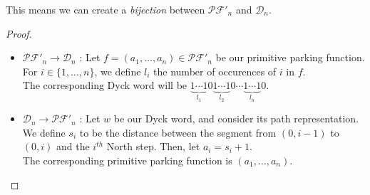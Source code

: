 \begin{example}[$n = 3$]
\begin{center}
    \end{center}
\end{example}

\begin{prop}
    This means we can create a \emph{bijection} between
    $\mathcal{PF'}_n$ and $\mathcal{D}_n$.
\end{prop}

\begin{proof}
    ~\
\begin{itemize}
    \item $\mathcal{PF'}_n \to \mathcal{D}_n$ :
    Let $f = (a_1, \ldots, a_n) \in \mathcal{PF'}_n$
    be our primitive parking function.
    For $i \in \{1, \ldots, n\}$, we define $l_i$ the
    number of occurences of $i$ in $f$.\\
    The corresponding Dyck word will be
    $\underbrace{1 \cdots 1}_{l_1}0
     \underbrace{1 \cdots 1}_{l_2}0 \cdots
     \underbrace{1 \cdots 1}_{l_n}0$.
    
    \item $\mathcal{D}_n \to \mathcal{PF'}_n$ :
    Let $w$ be our Dyck word, and consider its path
    representation. We define $s_i$ to be the distance
    between the segment from $(0, i - 1)$ to $(0, i)$
    and the $i^{th}$ North step. Then, let $a_i = s_i + 1$.\\
    The corresponding primitive parking function is 
    $(a_1, \ldots, a_n)$.
\end{itemize}
\end{proof}

